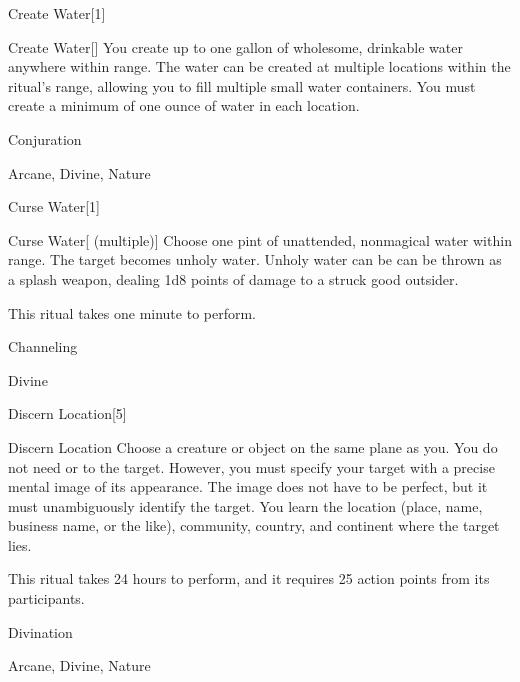 \begin{spellsection}{Create Water}[1]


\begin{ability}{Create Water}[]
You create up to one gallon of wholesome, drinkable water anywhere within \rngclose range.
The water can be created at multiple locations within the ritual's range, allowing you to fill multiple small water containers.
You must create a minimum of one ounce of water in each location.
\end{ability}




 Conjuration

 Arcane, Divine, Nature
\end{spellsection}


\begin{spellsection}{Curse Water}[1]


\begin{ability}{Curse Water}[ (multiple)]
Choose one pint of unattended, nonmagical water within \rngclose range.
The target becomes unholy water.
Unholy water can be can be thrown as a splash weapon, dealing 1d8 points of damage to a struck good outsider.

This ritual takes one minute to perform.
\end{ability}




 Channeling

 Divine
\end{spellsection}


\begin{spellsection}{Discern Location}[5]


\begin{ability}{Discern Location}
Choose a creature or object on the same plane as you.
You do not need  or  to the target.
However, you must specify your target with a precise mental image of its appearance.
The image does not have to be perfect, but it must unambiguously identify the target.
You learn the location (place, name, business name, or the like), community, country, and continent where the target lies.

This ritual takes 24 hours to perform, and it requires 25 action points from its participants.
\end{ability}




 Divination

 Arcane, Divine, Nature
\end{spellsection}


